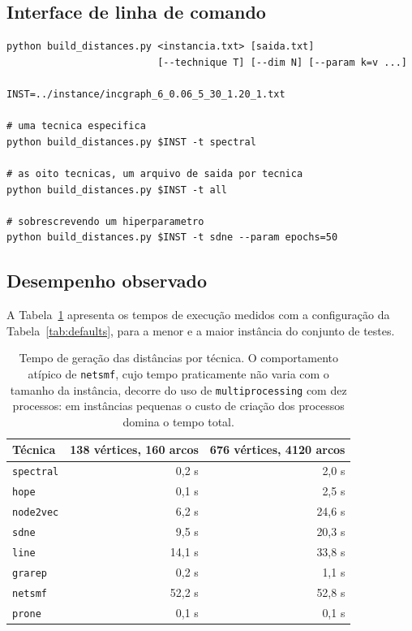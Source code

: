 \documentclass[12pt,a4paper]{article}
\begin{document}
\subsection{Interface de linha de comando}

\begin{lstlisting}[caption={Formas de invocação do módulo.},captionpos=b]
python build_distances.py <instancia.txt> [saida.txt]
                          [--technique T] [--dim N] [--param k=v ...]

INST=../instance/incgraph_6_0.06_5_30_1.20_1.txt

# uma tecnica especifica
python build_distances.py $INST -t spectral

# as oito tecnicas, um arquivo de saida por tecnica
python build_distances.py $INST -t all

# sobrescrevendo um hiperparametro
python build_distances.py $INST -t sdne --param epochs=50
\end{lstlisting}

\subsection{Desempenho observado}

A Tabela~\ref{tab:tempos} apresenta os tempos de execução medidos com a
configuração da Tabela~\ref{tab:defaults}, para a menor e a maior
instância do conjunto de testes.

\begin{table}[htbp]
\centering
\small
\begin{tabular}{@{}lrr@{}}
\toprule
\textbf{Técnica} & \textbf{138 vértices, 160 arcos} & \textbf{676 vértices, 4120 arcos} \\
\midrule
\texttt{spectral} & 0,2 s  & 2,0 s  \\
\texttt{hope}     & 0,1 s  & 2,5 s  \\
\texttt{node2vec} & 6,2 s  & 24,6 s \\
\texttt{sdne}     & 9,5 s  & 20,3 s \\
\texttt{line}     & 14,1 s & 33,8 s \\
\texttt{grarep}   & 0,2 s  & 1,1 s  \\
\texttt{netsmf}   & 52,2 s & 52,8 s \\
\texttt{prone}    & 0,1 s  & 0,1 s  \\
\bottomrule
\end{tabular}
\caption{Tempo de geração das distâncias por técnica. O comportamento
atípico de \texttt{netsmf}, cujo tempo praticamente não varia com o
tamanho da instância, decorre do uso de \texttt{multiprocessing} com dez
processos: em instâncias pequenas o custo de criação dos processos domina
o tempo total.}
\label{tab:tempos}
\end{table}
\end{document}
